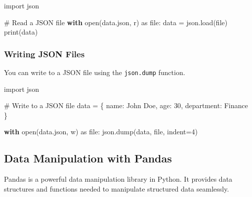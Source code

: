 \documentclass[
  letterpaper,
  DIV=11,
  numbers=noendperiod]{scrreprt}
\newenvironment{Shaded}{\begin{snugshade}}{\end{snugshade}}
\newcommand{\BuiltInTok}[1]{\textcolor[rgb]{0.00,0.23,0.31}{#1}}
\newcommand{\CommentTok}[1]{\textcolor[rgb]{0.37,0.37,0.37}{#1}}
\newcommand{\ControlFlowTok}[1]{\textcolor[rgb]{0.00,0.23,0.31}{\textbf{#1}}}
\newcommand{\DecValTok}[1]{\textcolor[rgb]{0.68,0.00,0.00}{#1}}
\newcommand{\ImportTok}[1]{\textcolor[rgb]{0.00,0.46,0.62}{#1}}
\newcommand{\NormalTok}[1]{\textcolor[rgb]{0.00,0.23,0.31}{#1}}
\newcommand{\OperatorTok}[1]{\textcolor[rgb]{0.37,0.37,0.37}{#1}}
\newcommand{\StringTok}[1]{\textcolor[rgb]{0.13,0.47,0.30}{#1}}
\begin{document}
\begin{Shaded}
\begin{Highlighting}[]
\ImportTok{import}\NormalTok{ json}

\CommentTok{\# Read a JSON file}
\ControlFlowTok{with} \BuiltInTok{open}\NormalTok{(}\StringTok{\textquotesingle{}data.json\textquotesingle{}}\NormalTok{, }\StringTok{\textquotesingle{}r\textquotesingle{}}\NormalTok{) }\ImportTok{as} \BuiltInTok{file}\NormalTok{:}
\NormalTok{    data }\OperatorTok{=}\NormalTok{ json.load(}\BuiltInTok{file}\NormalTok{)}
    \BuiltInTok{print}\NormalTok{(data)}
\end{Highlighting}
\end{Shaded}

\subsubsection{Writing JSON Files}\label{writing-json-files}

You can write to a JSON file using the \texttt{json.dump} function.

\begin{Shaded}
\begin{Highlighting}[]
\ImportTok{import}\NormalTok{ json}

\CommentTok{\# Write to a JSON file}
\NormalTok{data }\OperatorTok{=}\NormalTok{ \{}
    \StringTok{\textquotesingle{}name\textquotesingle{}}\NormalTok{: }\StringTok{\textquotesingle{}John Doe\textquotesingle{}}\NormalTok{,}
    \StringTok{\textquotesingle{}age\textquotesingle{}}\NormalTok{: }\DecValTok{30}\NormalTok{,}
    \StringTok{\textquotesingle{}department\textquotesingle{}}\NormalTok{: }\StringTok{\textquotesingle{}Finance\textquotesingle{}}
\NormalTok{\}}

\ControlFlowTok{with} \BuiltInTok{open}\NormalTok{(}\StringTok{\textquotesingle{}data.json\textquotesingle{}}\NormalTok{, }\StringTok{\textquotesingle{}w\textquotesingle{}}\NormalTok{) }\ImportTok{as} \BuiltInTok{file}\NormalTok{:}
\NormalTok{    json.dump(data, }\BuiltInTok{file}\NormalTok{, indent}\OperatorTok{=}\DecValTok{4}\NormalTok{)}
\end{Highlighting}
\end{Shaded}

\subsection{Data Manipulation with
Pandas}\label{data-manipulation-with-pandas}

Pandas is a powerful data manipulation library in Python. It provides
data structures and functions needed to manipulate structured data
seamlessly.
\end{document}
